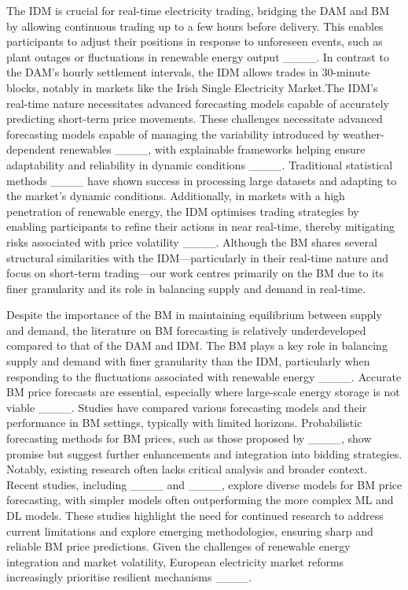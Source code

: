 The IDM is crucial for real-time electricity trading, bridging the DAM and BM by allowing continuous trading up to a few hours before delivery. This enables participants to adjust their positions in response to unforeseen events, such as plant outages or fluctuations in renewable energy output ____. In contrast to the DAM's hourly settlement intervals, the IDM allows trades in 30-minute blocks, notably in markets like the Irish Single Electricity Market.The IDM's real-time nature necessitates advanced forecasting models capable of accurately predicting short-term price movements. These challenges necessitate advanced forecasting models capable of managing the variability introduced by weather-dependent renewables ____, with explainable frameworks helping ensure adaptability and reliability in dynamic conditions ____. Traditional statistical methods ____ have shown success in processing large datasets and adapting to the market's dynamic conditions. Additionally, in markets with a high penetration of renewable energy, the IDM optimises trading strategies by enabling participants to refine their actions in near real-time, thereby mitigating risks associated with price volatility ____. Although the BM shares several structural similarities with the IDM—particularly in their real-time nature and focus on short-term trading—our work centres primarily on the BM due to its finer granularity and its role in balancing supply and demand in real-time.

Despite the importance of the BM in maintaining equilibrium between supply and demand, the literature on BM forecasting is relatively underdeveloped compared to that of the DAM and IDM. The BM plays a key role in balancing supply and demand with finer granularity than the IDM, particularly when responding to the fluctuations associated with renewable energy ____. Accurate BM price forecasts are essential, especially where large-scale energy storage is not viable ____. Studies have compared various forecasting models and their performance in BM settings, typically with limited horizons. Probabilistic forecasting methods for BM prices, such as those proposed by ____, show promise but suggest further enhancements and integration into bidding strategies. Notably, existing research often lacks critical analysis and broader context. Recent studies, including ____ and ____, explore diverse models for BM price forecasting, with simpler models often outperforming the more complex ML and DL models. These studies highlight the need for continued research to address current limitations and explore emerging methodologies, ensuring sharp and reliable BM price predictions. Given the challenges of renewable energy integration and market volatility, European electricity market reforms increasingly prioritise resilient mechanisms ____.






